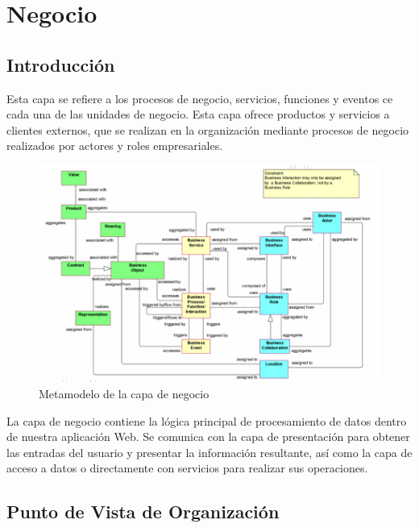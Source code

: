 \chapter{Negocio}

\section{Introducción}

Esta capa se refiere a los procesos de negocio, servicios, funciones y eventos ce cada una de las unidades de negocio. Esta capa ofrece productos y servicios a clientes externos, que se realizan en la organización mediante procesos de negocio realizados por actores y roles empresariales.

\begin{figure}[th!]
	\centering
	\includegraphics[width=0.6\linewidth]{arquitectura/imagenes/negocio}
	\caption{Metamodelo de la capa de negocio }
	\label{fig:negocio}
\end{figure}

La capa de negocio contiene la lógica principal de procesamiento de datos dentro de nuestra aplicación Web. Se comunica con la capa de presentación para obtener las entradas del usuario y presentar la información resultante, así como la capa de acceso a datos o directamente con servicios para realizar sus operaciones.

\newpage

\section{Punto de Vista de Organización}

